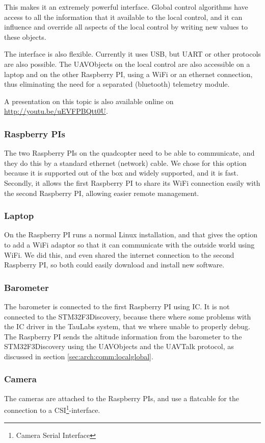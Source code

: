 \documentclass[11pt, a4paper, onecolumn, oneside, parskip=half]{scrartcl}
\begin{document}
This makes it an extremely powerful interface. Global control algorithms have access to all the information that it available to the local control, and it can influence and override all aspects of the local control by writing new values to these objects.

The interface is also flexible. Currently it uses USB, but UART or other protocols are also possible. The UAVObjects on the local control are also accessible on a laptop and on the other Raspberry PI, using a WiFi or an ethernet connection, thus eliminating the need for a separated (bluetooth) telemetry module.

A presentation on this topic is also available online on \url{http://youtu.be/uEVFPBQtt0U}.

\subsubsection{Raspberry PIs}
The two Raspberry PIs on the quadcopter need to be able to communicate, and they do this by a standard ethernet (network) cable. We chose for this option because it is supported out of the box and widely supported, and it is fast. Secondly, it allows the first Raspberry PI to share its WiFi connection easily with the second Raspberry PI, allowing easier remote management.

\subsubsection{Laptop}
On the Raspberry PI runs a normal Linux installation, and that gives the option to add a WiFi adaptor so that it can communicate with the outside world using WiFi. We did this, and even shared the internet connection to the second Raspberry PI, so both could easily download and install new software.

\subsubsection{Barometer}
The barometer is connected to the first Raspberry PI using I\texttwosuperior C. It is not connected to the STM32F3Discovery, because there where some problems with the I\texttwosuperior C driver in the TauLabs system, that we where unable to properly debug. The Raspberry PI sends the altitude information from the barometer to the STM32F3Discovery using the UAVObjects and the UAVTalk protocol, as discussed in section \ref{sec:arch:comm:localglobal}.

\subsubsection{Camera}
The cameras are attached to the Raspberry PIs, and use a flatcable for the connection to a CSI\footnote{Camera Serial Interface}-interface.
\end{document}
